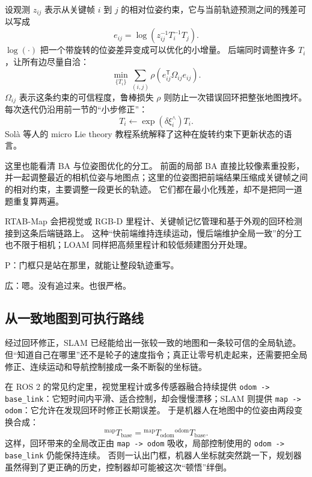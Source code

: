 设观测 $z_{ij}$ 表示从关键帧 $i$ 到 $j$ 的相对位姿约束，它与当前轨迹预测之间的残差可以写成
\begin{equation}
e_{ij}=
\log\left(z_{ij}^{-1}T_i^{-1}T_j\right).
\end{equation}
$\log(\cdot)$ 把一个带旋转的位姿差异变成可以优化的小增量。
后端同时调整许多 $T_i$，让所有边尽量自洽：
\begin{equation}
\min_{\{T_i\}}\sum_{(i,j)}
\rho\!\left(e_{ij}^{\mathsf T}\Omega_{ij}e_{ij}\right).
\end{equation}
$\Omega_{ij}$ 表示这条约束的可信程度，鲁棒损失 $\rho$ 则防止一次错误回环把整张地图拽坏。
每次迭代仍沿用前一节的“小步修正”：
\begin{equation}
T_i\leftarrow\exp(\delta\xi_i^\wedge)T_i.
\end{equation}
Solà 等人的 micro Lie theory 教程系统解释了这种在旋转约束下更新状态的语言\cite{sola2018lie}。

这里也能看清 BA 与位姿图优化的分工。
前面的局部 BA 直接比较像素重投影，并一起调整最近的相机位姿与地图点；这里的位姿图把前端结果压缩成关键帧之间的相对约束，主要调整一段更长的轨迹。
它们都在最小化残差，却不是把同一道题重复算两遍。

RTAB-Map 会把视觉或 RGB-D 里程计、关键帧记忆管理和基于外观的回环检测接到这条后端链路上\cite{labbe2013rtabmap}。
这种“快前端维持连续运动，慢后端维护全局一致”的分工也不限于相机；LOAM 同样把高频里程计和较低频建图分开处理\cite{zhang2014loam}。

P：门框只是站在那里，就能让整段轨迹重写。

広：嗯。没有追过来。也很严格。

\subsection{从一致地图到可执行路线}

经过回环修正，SLAM 已经能给出一张较一致的地图和一条较可信的全局轨迹。
但“知道自己在哪里”还不是轮子的速度指令；真正让零号机走起来，还需要把全局修正、连续运动和导航控制接成一条不断裂的坐标链。

在 ROS 2 的常见约定里，视觉里程计或多传感器融合持续提供 \texttt{odom -> base\_link}：它短时间内平滑、适合控制，却会慢慢漂移；SLAM 则提供 \texttt{map -> odom}：它允许在发现回环时修正长期误差\cite{nav2docs}。
于是机器人在地图中的位姿由两段变换合成：
\begin{equation}
{}^{\mathrm{map}}T_{\mathrm{base}}
=
{}^{\mathrm{map}}T_{\mathrm{odom}}
{}^{\mathrm{odom}}T_{\mathrm{base}}.
\end{equation}
这样，回环带来的全局改正由 \texttt{map -> odom} 吸收，局部控制使用的 \texttt{odom -> base\_link} 仍能保持连续。
否则一认出门框，机器人坐标就突然跳一下，规划器虽然得到了更正确的历史，控制器却可能被这次“顿悟”绊倒。

